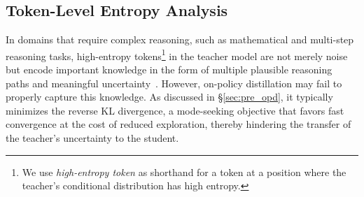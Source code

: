\subsection{Token-Level Entropy Analysis}\label{sec:diversity}

In domains that require complex reasoning, such as mathematical and multi-step reasoning tasks, high-entropy tokens\footnote{We use {\em high-entropy token} as shorthand for a token at a position where the teacher's conditional distribution has high entropy.} in the teacher model are not merely noise but encode important knowledge in the form of multiple plausible reasoning paths and meaningful uncertainty~\cite{wang2025beyond, cheng2025reasoning}. However, on-policy distillation may fail to properly capture this knowledge. As discussed in \S\ref{sec:pre_opd}, it typically minimizes the reverse KL divergence, a mode-seeking objective that favors fast convergence at the cost of reduced exploration, thereby hindering the transfer of the teacher's uncertainty to the student.


